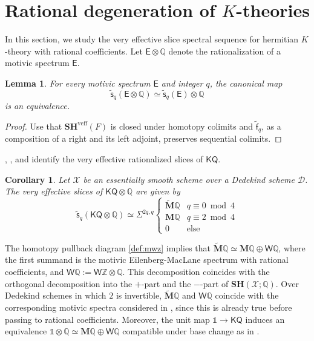 \documentclass[11pt,hyp,english]{article}
\newcommand{\E}{\mathsf{E}}
\newcommand{\Z}{\mathbb{Z}}
\newcommand{\Q}{\mathbb{Q}}
\newcommand{\unit}{\mathds{1}}
\newcommand{\KQ}{\mathsf{KQ}}
\newcommand{\HQ}{\mathbf{M}\Q}
\newcommand{\cHQ}{{\wt{\mathbf{M}}}{\Q}}
\newcommand{\HWZ}{\mathsf{W}\Z}
\newcommand{\SH}{\mathbf{SH}}
\newcommand{\colim}{\operatorname{colim}}
\newcommand{\tensor}{\otimes}
\newcommand{\wt}[1]{\widetilde{#1}}
\newcommand{\vs}{\tilde{\mathsf{s}}}
\newcommand{\vf}{\tilde{{\mathsf{f}}}}
\newcommand{\veff}{\text{veff}}
\newcommand{\upi}{\underline{\pi}}
\newtheorem{lemma}[theorem]{Lemma}
\newtheorem{corollary}[theorem]{Corollary}
\theoremstyle{definition}
\begin{document}
\section{Rational degeneration of $K$-theories}
\label{section:rdokt}

In this section, 
we study the very effective slice spectral sequence for hermitian $K$-theory with rational coefficients.
Let $\E\tensor \Q$ denote the rationalization of a motivic spectrum $\E$.

\begin{lemma}
\label{lemma:rationalizedsplices}
For every motivic spectrum $\E$ and integer $q$, 
the canonical map
\[
\vs_{q}(\E\tensor\Q)
\simeq
\vs_{q}(\E)\tensor\Q
\]
is an equivalence.
\end{lemma}
\begin{proof}
Use that $\SH^{\veff}(F)$ is closed under homotopy colimits and $\vf_q$, 
as a composition of a right and its left adjoint, 
preserves sequential colimits.
\end{proof}


, , and   
identify the very effective rationalized slices of $\KQ$.

\begin{corollary}
\label{corollary:rationalslices}
Let $\mathcal{X}$ be an essentially smooth scheme over a Dedekind scheme $\mathcal{D}$.
The very effective slices of $\KQ\tensor\Q$ are given by 
\[
\vs_{q}(\KQ\tensor\Q) 
\simeq
\Sigma^{2q,q}
\begin{cases}
\cHQ & q \equiv 0 \bmod 4 \\
\HQ  & q \equiv 2 \bmod 4 \\
0    & \text{else}
\end{cases}
\]
\end{corollary}

The homotopy pullback diagram \eqref{def:mwz} implies that $\cHQ\simeq \HQ \oplus \mathsf{W}\Q$, where the first summand is the motivic Eilenberg-MacLane spectrum with rational coefficients, and $\mathsf{W}\Q:=\HWZ\tensor \Q$.
This decomposition coincides with the orthogonal decomposition into the $+$-part and the $-$-part of $\SH(\mathcal{X};\Q)$.
Over Dedekind schemes in which $2$ is invertible, $\cHQ$ and $\mathsf{W}\Q$ coincide with the corresponding motivic spectra considered in \cite{dfjk}, 
since this is already true before passing to rational coefficients.
Moreover, the unit map $\unit \to \KQ$ induces an equivalence 
$\unit\tensor \Q\simeq \HQ\oplus \mathsf{W}\Q$ compatible under base change as in  
\cite[Corollary 6.2]{dfjk}.
\end{document}

